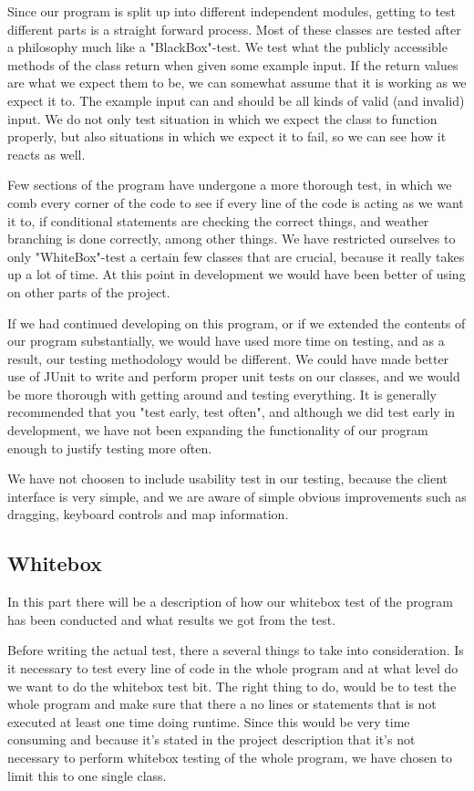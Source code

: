 \documentclass[a4paper,10pt,titlepage]{article}
\begin{document}
Since our program is split up into different independent modules, getting to test different parts is a straight forward process. Most of these classes are tested after a philosophy much like a "BlackBox"-test. We test what the publicly accessible methods of the class return when given some example input. If the return values are what we expect them to be, we can somewhat assume that it is working as we expect it to. The example input can and should be all kinds of valid (and invalid) input. We do not only test situation in which we expect the class to function properly, but also situations in which we expect it to fail, so we can see how it reacts as well.

Few sections of the program have undergone a more thorough test, in which we comb every corner of the code to see if every line of the code is acting as we want it to, if conditional statements are checking the correct things, and weather branching is done correctly, among other things. We have restricted ourselves to only "WhiteBox"-test a certain few classes that are crucial, because it really takes up a lot of time. At this point in development we would have been better of using on other parts of the project.

If we had continued developing on this program, or if we extended the contents of our program substantially, we would have used more time on testing, and as a result, our testing methodology would be different. We could have made better use of JUnit to write and perform proper unit tests on our classes, and we would be more thorough with getting around and testing everything. It is generally recommended that you "test early, test often", and although we did test early in development, we have not been expanding the functionality of our program enough to justify testing more often. 

We have not choosen to include usability test in our testing, because the client interface is very simple, and we are aware of simple obvious improvements such as dragging, keyboard controls and map information.

	
		
		\subsection{Whitebox}		
			In this part there will be a description of how our whitebox test of the program has been conducted and what results we got from the test. 

Before writing the actual test, there a several things to take into consideration. Is it necessary to test every line of code in the whole program and at what level do we want to do the whitebox test bit. The right thing to do, would be to test the whole program and make sure that there a no lines or statements that is not executed at least one time doing runtime. Since this would be very time consuming and because it's stated in the project description that it's not necessary to perform whitebox testing of the whole program, we have chosen to limit this to one single class.  
\end{document}
